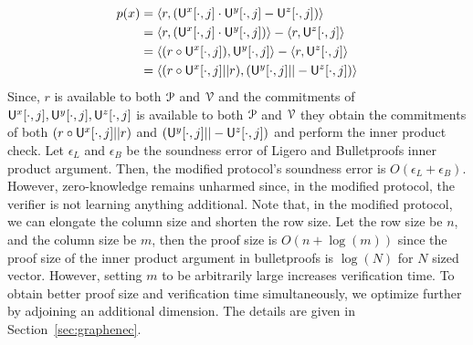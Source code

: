 \begin{align*}
	p(x) & = \langle r,(\mathsf{U}^x[\cdot,j] \cdot \mathsf{U}^y[\cdot,j] - \mathsf{U}^z[\cdot,j])\rangle \\
	& = \langle r,(\mathsf{U}^x[\cdot,j] \cdot \mathsf{U}^y[\cdot,j])\rangle - \langle r,\mathsf{U}^z[\cdot,j]\rangle \\
	& = \langle (r \circ \mathsf{U}^x[\cdot,j]), \mathsf{U}^y[\cdot,j]\rangle - \langle r,\mathsf{U}^z[\cdot,j]\rangle \\
	& = \langle (r \circ \mathsf{U}^x[\cdot,j] || r),(  \mathsf{U}^y[\cdot,j] || - \mathsf{U}^z[\cdot,j])\rangle \\
\end{align*}
Since, $r$ is available to both $\mathcal{P}$ and $\mathcal{V}$ and the commitments of $ \mathsf{U}^x[\cdot,j],  \mathsf{U}^y[\cdot,j],  \mathsf{U}^z[\cdot,j]$ is available to both $\mathcal{P}$ and $\mathcal{V}$ they obtain the commitments of both $(r \circ \mathsf{U}^x[\cdot,j] || r)$ and $ (\mathsf{U}^y[\cdot,j] || - \mathsf{U}^z[\cdot,j] )$ and perform the inner product check.
Let $\epsilon_L$ and $\epsilon_B$ be the soundness error of Ligero and Bulletproofs inner product argument. Then, the modified protocol's soundness error is $O(\epsilon_L + \epsilon_B)$. However, zero-knowledge remains unharmed since, in the modified protocol, the verifier is not learning anything additional. 
Note that, in the modified protocol, we can elongate the column size and shorten the row size. Let the row size be $n$, and the column size be $m$, then the proof size is $O(n + \log (m))$ since the proof size of the inner product argument in bulletproofs is $\log (N)$ for $N$ sized vector.
However, setting $m$ to be arbitrarily large increases verification time. 
To obtain better proof size and verification time simultaneously, we optimize further by adjoining an additional dimension. The details are given in Section~\ref{sec:graphenec}.
